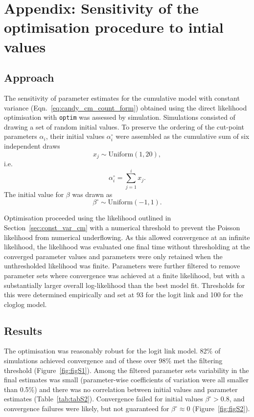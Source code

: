 \newpage
\appendix
\renewcommand\thefigure{S\arabic{figure}}    
\setcounter{figure}{0} 
\renewcommand\thetable{S\arabic{table}}    
\setcounter{table}{0}

\section{Appendix: Sensitivity of the optimisation procedure to intial values}
\subsection{Approach}
\label{sec:appendix}
The sensitivity of parameter estimates for the cumulative model with constant variance (Eqn.~\ref{eq:candy_cm_count_form}) obtained using the direct likelihood optimisation with \verb+optim+ was assessed by simulation.
Simulations consisted of drawing a set of random initial values. To preserve the ordering of the cut-point parameters $\alpha_i$, their initial values $\alpha^{\circ}_i$ were assembled as the cumulative sum of six independent draws $$x_j \sim \mathrm{Uniform}(1,20),$$ i.e. $$\alpha^{\circ}_i = \sum_{j=1}^i x_j.$$ The initial value for $\beta$ was drawn as $$\beta^{\circ}\sim\mathrm{Uniform}(-1,1).$$

Optimisation proceeded using the likelihood outlined in Section~\ref{sec:const_var_cm} with a numerical threshold to prevent the Poisson likelihood from numerical underflowing. As this allowed convergence at an infinite likelihood, the likelihood was evaluated one final time without thresholding at the converged parameter values and parameters were only retained when the unthresholded likelihood was finite. 
Parameters were further filtered to remove parameter sets where convergence was achieved at a finite likelihood, but with a substantially larger overall log-likelihood than the best model fit. Thresholds for this were determined empirically and set at 93 for the logit link and 100 for the cloglog model.

\subsection{Results}
The optimisation was reasonably robust for the logit link model. 82\% of simulations achieved convergence and of these over 98\% met the filtering threshold (Figure~\ref{fig:figS1}). Among the filtered parameter sets variability in the final estimates was small (parameter-wise coefficients of variation were all smaller than 0.5\%) and there was no correlation between initial values and parameter estimates (Table~\ref{tab:tabS2}). Convergence failed for initial values $\beta^{\circ}>0.8$, and convergence failures were likely, but not guaranteed for $\beta^{\circ}\approx 0$ (Figure~\ref{fig:figS2}).

